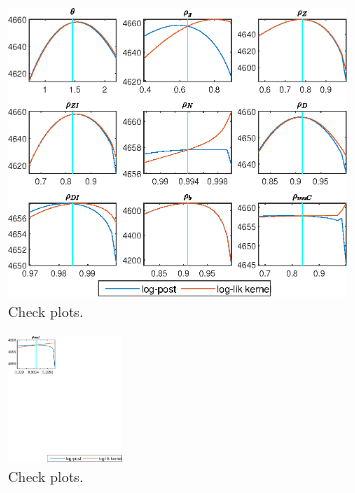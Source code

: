 \begin{figure}[H]
\centering 
\includegraphics[width=0.80\textwidth]{BRS_sectoral_wo_fixed_cost/graphs/BRS_sectoral_wo_fixed_cost_CheckPlots3}
\caption{Check plots.}\label{Fig:CheckPlots:3}
\end{figure}
 
\begin{figure}[H]
\centering 
\includegraphics[width=0.27\textwidth]{BRS_sectoral_wo_fixed_cost/graphs/BRS_sectoral_wo_fixed_cost_CheckPlots4}
\caption{Check plots.}\label{Fig:CheckPlots:4}
\end{figure}
 
